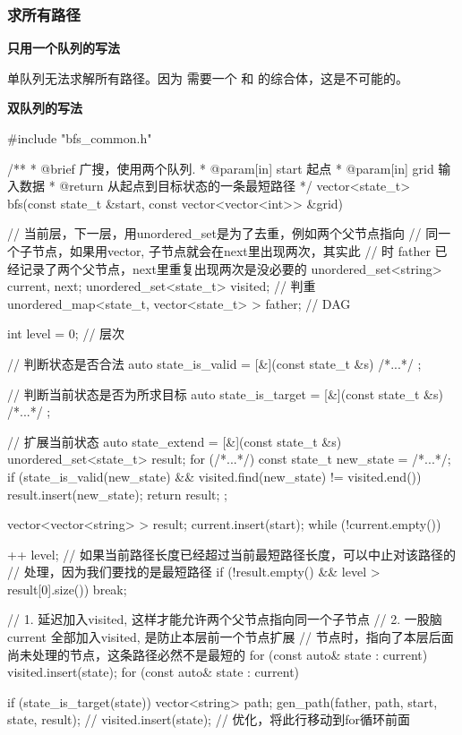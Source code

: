 \subsubsection{求所有路径}

\textbf{只用一个队列的写法}

单队列无法求解所有路径。因为 需要一个  和  的综合体，这是不可能的。


\textbf{双队列的写法}

\begin{Codex}[label=bfs_template.cpp]
#include "bfs_common.h"

/**
 * @brief 广搜，使用两个队列.
 * @param[in] start 起点
 * @param[in] grid 输入数据
 * @return 从起点到目标状态的一条最短路径
 */
vector<state_t> bfs(const state_t &start, const vector<vector<int>> &grid) {
    // 当前层，下一层，用unordered_set是为了去重，例如两个父节点指向
    // 同一个子节点，如果用vector, 子节点就会在next里出现两次，其实此
    // 时 father 已经记录了两个父节点，next里重复出现两次是没必要的
    unordered_set<string> current, next;
    unordered_set<state_t> visited; // 判重
    unordered_map<state_t, vector<state_t> > father; // DAG

    int level = 0;  // 层次

    // 判断状态是否合法
    auto state_is_valid = [&](const state_t &s) { /*...*/ };

    // 判断当前状态是否为所求目标
    auto state_is_target = [&](const state_t &s) { /*...*/ };

    // 扩展当前状态
    auto state_extend = [&](const state_t &s) {
        unordered_set<state_t> result;
        for (/*...*/) {
            const state_t new_state = /*...*/;
            if (state_is_valid(new_state) && 
                    visited.find(new_state) != visited.end()) {
                result.insert(new_state);
            }
        }
        return result;
    };

    vector<vector<string> > result;
    current.insert(start);
    while (!current.empty()) {
        ++ level;
        // 如果当前路径长度已经超过当前最短路径长度，可以中止对该路径的
        // 处理，因为我们要找的是最短路径
        if (!result.empty() && level > result[0].size()) break;

        // 1. 延迟加入visited, 这样才能允许两个父节点指向同一个子节点
        // 2. 一股脑current 全部加入visited, 是防止本层前一个节点扩展
        // 节点时，指向了本层后面尚未处理的节点，这条路径必然不是最短的
        for (const auto& state : current)
            visited.insert(state);
        for (const auto& state : current) {
            if (state_is_target(state)) {
                vector<string> path;
                gen_path(father, path, start, state, result);
            }
            // visited.insert(state); // 优化，将此行移动到for循环前面

}}}
\end{Codex}

